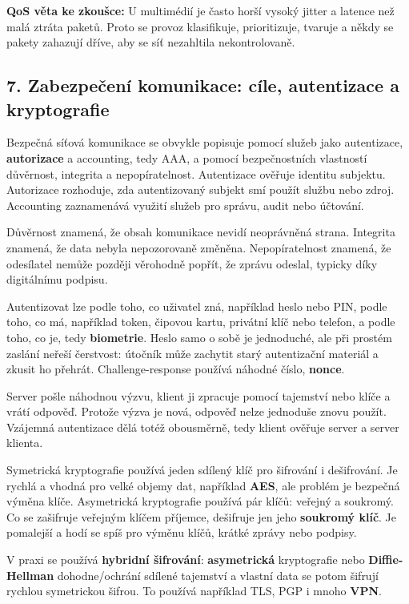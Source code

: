 \documentclass[11pt,a4paper]{article}
\newcommand{\itzk}[1]{\medskip\noindent\colorbox{blue!7}{\parbox{\dimexpr\linewidth-2\fboxsep}{#1}}\medskip}
\begin{document}
\itzk{\textbf{QoS věta ke zkoušce:} U multimédií je často horší vysoký jitter a latence než malá ztráta paketů. Proto se provoz klasifikuje, prioritizuje, tvaruje a někdy se pakety zahazují dříve, aby se síť nezahltila nekontrolovaně.}

\subsection*{7. Zabezpečení komunikace: cíle, autentizace a kryptografie}

Bezpečná síťová komunikace se obvykle popisuje pomocí služeb jako autentizace, \textbf{autorizace} a accounting, tedy AAA, a pomocí bezpečnostních vlastností důvěrnost, integrita a nepopíratelnost. Autentizace ověřuje identitu subjektu. Autorizace rozhoduje, zda autentizovaný subjekt smí použít službu nebo zdroj. Accounting zaznamenává využití služeb pro správu, audit nebo účtování.

Důvěrnost znamená, že obsah komunikace nevidí neoprávněná strana. Integrita znamená, že data nebyla nepozorovaně změněna. Nepopíratelnost znamená, že odesílatel nemůže později věrohodně popřít, že zprávu odeslal, typicky díky digitálnímu podpisu.

Autentizovat lze podle toho, co uživatel zná, například heslo nebo PIN, podle toho, co má, například token, čipovou kartu, privátní klíč nebo telefon, a podle toho, co je, tedy \textbf{biometrie}. Heslo samo o sobě je jednoduché, ale při prostém zaslání neřeší čerstvost: útočník může zachytit starý autentizační materiál a zkusit ho přehrát. Challenge-response používá náhodné číslo, \textbf{nonce}.

Server pošle náhodnou výzvu, klient ji zpracuje pomocí tajemství nebo klíče a vrátí odpověď. Protože výzva je nová, odpověď nelze jednoduše znovu použít. Vzájemná autentizace dělá totéž obousměrně, tedy klient ověřuje server a server klienta.

Symetrická kryptografie používá jeden sdílený klíč pro šifrování i dešifrování. Je rychlá a vhodná pro velké objemy dat, například \textbf{AES}, ale problém je bezpečná výměna klíče. Asymetrická kryptografie používá pár klíčů: veřejný a soukromý. Co se zašifruje veřejným klíčem příjemce, dešifruje jen jeho \textbf{soukromý klíč}. Je pomalejší a hodí se spíš pro výměnu klíčů, krátké zprávy nebo podpisy.

V praxi se používá \textbf{hybridní šifrování}: \textbf{asymetrická} kryptografie nebo \textbf{Diffie-Hellman} dohodne/ochrání sdílené tajemství a vlastní data se potom šifrují rychlou symetrickou šifrou. To používá například TLS, PGP i mnoho \textbf{VPN}.
\end{document}

